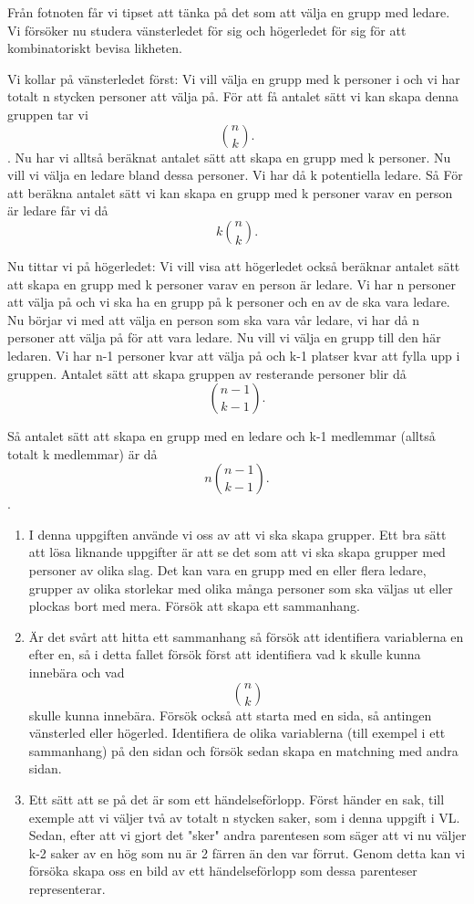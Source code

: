 \documentclass{tufte-handout}
\begin{document}
\begin{solution}
	Från fotnoten får vi tipset att tänka på det som att välja en grupp med ledare. Vi försöker nu studera vänsterledet för sig och högerledet för sig för att kombinatoriskt bevisa likheten.

    Vi kollar på vänsterledet först: Vi vill välja en grupp med k personer i och vi har totalt n stycken personer att välja på. För att få antalet sätt vi kan skapa denna gruppen tar vi $$\binom{n}{k}.$$. Nu har vi alltså beräknat antalet sätt att skapa en grupp med k personer. Nu vill vi välja en ledare bland dessa personer. Vi har då k potentiella ledare. Så För att beräkna antalet sätt vi kan skapa en grupp med k personer varav en person är ledare får vi då 
	$$k\binom{n}{k}.$$

    Nu tittar vi på högerledet: Vi vill visa att högerledet också beräknar antalet sätt att skapa en grupp med k personer varav en person är ledare. Vi har n personer att välja på och vi ska ha en grupp på k personer och en av de ska vara ledare. Nu börjar vi med att välja en person som ska vara vår ledare, vi har då n personer att välja på för att vara ledare. Nu vill vi välja en grupp till den här ledaren. Vi har n-1 personer kvar att välja på och k-1 platser kvar att fylla upp i gruppen. Antalet sätt att skapa gruppen av resterande personer blir då
	$$\binom{n-1}{k-1}.$$
	
	Så antalet sätt att skapa en grupp med en ledare och k-1 medlemmar (alltså totalt k medlemmar) är då $$n \binom{n-1}{k-1}.$$. 

	\begin{tips}
		\begin{enumerate}
			\item I denna uppgiften använde vi oss av att vi ska skapa grupper. Ett bra sätt att lösa liknande uppgifter är att se det som att vi ska skapa grupper med personer av olika slag. Det kan vara en grupp med en eller flera ledare, grupper av olika storlekar med olika många personer som ska väljas ut eller plockas bort med mera. Försök att skapa ett sammanhang.
			\item Är det svårt att hitta ett sammanhang så försök att identifiera variablerna en efter en, så i detta fallet försök först att identifiera vad k skulle kunna innebära och vad $$\binom{n}{k}$$ skulle kunna innebära. Försök också att starta med en sida, så antingen vänsterled eller högerled. Identifiera de olika variablerna (till exempel i ett sammanhang) på den sidan och försök sedan skapa en matchning med andra sidan.
			\item Ett sätt att se på det är som ett händelseförlopp. Först händer en sak, till exemple att vi väljer två av totalt n stycken saker, som i denna uppgift i VL. Sedan, efter att vi gjort det "sker" andra parentesen som säger att vi nu väljer k-2 saker av en hög som nu är 2 färren än den var förrut. Genom detta kan vi försöka skapa oss en bild av ett händelseförlopp som dessa parenteser representerar. 
		\end{enumerate}
	\end{tips}
\end{solution}
\end{document}
